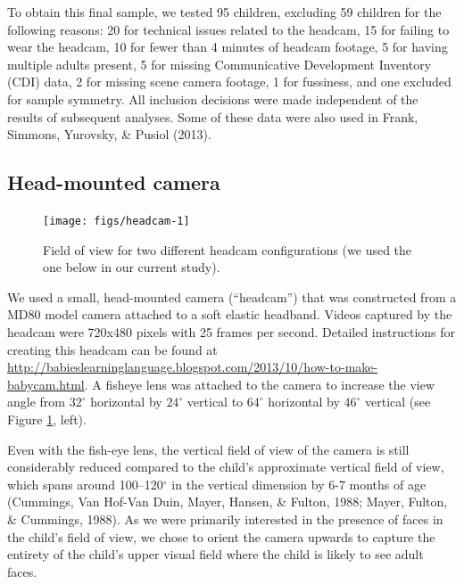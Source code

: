 \documentclass[10pt, letterpaper]{article}
\newenvironment{CodeChunk}{}{}
\begin{document}
To obtain this final sample, we tested 95 children, excluding 59
children for the following reasons: 20 for technical issues related to
the headcam, 15 for failing to wear the headcam, 10 for fewer than 4
minutes of headcam footage, 5 for having multiple adults present, 5 for
missing Communicative Development Inventory (CDI) data, 2 for missing
scene camera footage, 1 for fussiness, and one excluded for sample
symmetry. All inclusion decisions were made independent of the results
of subsequent analyses. Some of these data were also used in Frank,
Simmons, Yurovsky, \& Pusiol (2013).

\subsection{Head-mounted camera}\label{head-mounted-camera}

\begin{CodeChunk}
\begin{figure}[H]

{\centering \texttt{[image: figs/headcam-1]} 

}

\caption[Field of view for two different headcam configurations (we used the one below in our current study)]{Field of view for two different headcam configurations (we used the one below in our current study).}\label{fig:headcam}
\end{figure}
\end{CodeChunk}

We used a small, head-mounted camera (``headcam'') that was constructed
from a MD80 model camera attached to a soft elastic headband. Videos
captured by the headcam were 720x480 pixels with 25 frames per second.
Detailed instructions for creating this headcam can be found at
\url{http://babieslearninglanguage.blogspot.com/2013/10/how-to-make-babycam.html}.
A fisheye lens was attached to the camera to increase the view angle
from \(32^{\circ}\) horizontal by \(24^{\circ}\) vertical to
\(64^{\circ}\) horizontal by \(46^{\circ}\) vertical (see Figure
\ref{fig:headcam}, left).

Even with the fish-eye lens, the vertical field of view of the camera is
still considerably reduced compared to the child's approximate vertical
field of view, which spans around 100--120\(^{\circ}\) in the vertical
dimension by 6-7 months of age (Cummings, Van Hof-Van Duin, Mayer,
Hansen, \& Fulton, 1988; Mayer, Fulton, \& Cummings, 1988). As we were
primarily interested in the presence of faces in the child's field of
view, we chose to orient the camera upwards to capture the entirety of
the child's upper visual field where the child is likely to see adult
faces.
\end{document}
